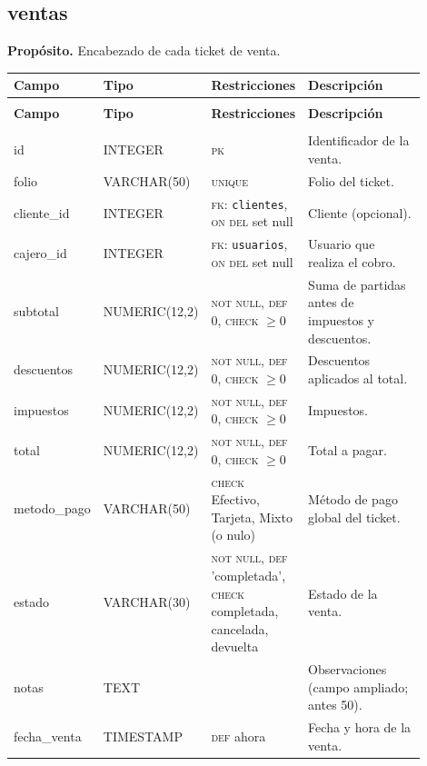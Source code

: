 \documentclass[11pt]{article}
\makeatletter
\newenvironment{campos}{%
  \par\footnotesize
  \setlength{\LTpre}{0.3ex}\setlength{\LTpost}{0.6ex}
  \begin{longtable}{@{}>{\ttfamily}p{0.165\linewidth} >{\ttfamily}p{0.150\linewidth} p{0.205\linewidth} >{\raggedright\arraybackslash}p{0.385\linewidth}@{}}
  \toprule
  \normalfont\bfseries Campo & \normalfont\bfseries Tipo & \normalfont\bfseries Restricciones & \normalfont\bfseries Descripción \\
  \midrule \endfirsthead
  \multicolumn{4}{@{}l}{\footnotesize\itshape \dots\ continuación}\\[0.3ex]
  \toprule
  \normalfont\bfseries Campo & \normalfont\bfseries Tipo & \normalfont\bfseries Restricciones & \normalfont\bfseries Descripción \\
  \midrule \endhead
  \midrule \multicolumn{4}{r@{}}{\footnotesize\itshape continúa en la siguiente página}\\ \endfoot
  \bottomrule \endlastfoot
}{%
  \end{longtable}\par
}
\newcommand{\proposito}[1]{\par\vspace{0.2ex}\noindent\colorbox{brandlight}{\parbox{\dimexpr\linewidth-2\fboxsep}{\small\textbf{Propósito.} #1}}\par\vspace{0.8ex}}
\newcommand{\pk}{\textsc{pk}}
\newcommand{\fk}[1]{\textsc{fk}: \texttt{#1}}
\newcommand{\nn}{\textsc{not null}}
\newcommand{\uq}{\textsc{unique}}
\makeatother
\begin{document}
\subsection{ventas}
\proposito{Encabezado de cada ticket de venta.}
\begin{campos}
id          & INTEGER       & \pk{}     & Identificador de la venta. \\
folio       & VARCHAR(50)   & \uq       & Folio del ticket. \\
cliente\_id & INTEGER       & \fk{clientes}, \textsc{on del} set null & Cliente (opcional). \\
cajero\_id  & INTEGER       & \fk{usuarios}, \textsc{on del} set null & Usuario que realiza el cobro. \\
subtotal    & NUMERIC(12,2) & \nn, \textsc{def} 0, \textsc{check} $\geq 0$ & Suma de partidas antes de impuestos y descuentos. \\
descuentos  & NUMERIC(12,2) & \nn, \textsc{def} 0, \textsc{check} $\geq 0$ & Descuentos aplicados al total. \\
impuestos   & NUMERIC(12,2) & \nn, \textsc{def} 0, \textsc{check} $\geq 0$ & Impuestos. \\
total       & NUMERIC(12,2) & \nn, \textsc{def} 0, \textsc{check} $\geq 0$ & Total a pagar. \\
metodo\_pago & VARCHAR(50)  & \textsc{check} Efectivo, Tarjeta, Mixto (o nulo) & Método de pago global del ticket. \\
estado      & VARCHAR(30)   & \nn, \textsc{def} 'completada', \textsc{check} completada, cancelada, devuelta & Estado de la venta. \\
notas       & TEXT          &           & Observaciones (campo ampliado; antes 50). \\
fecha\_venta & TIMESTAMP    & \textsc{def} ahora & Fecha y hora de la venta. \\
\end{campos}
\end{document}

